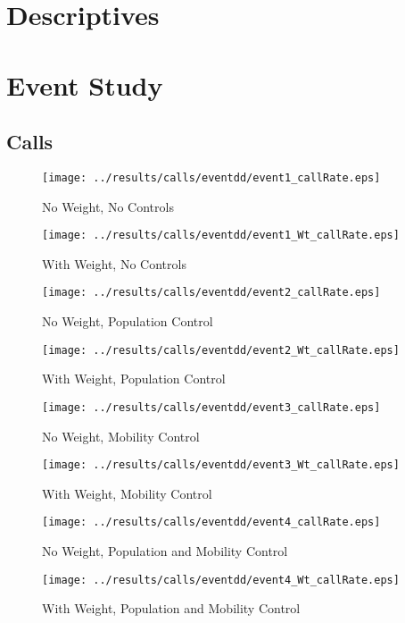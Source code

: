 \documentclass[11pt,letterpaper]{article}
\begin{document}
\section{Descriptives}

\section{Event Study}
	\subsection{Calls}
\begin{figure}[H]
\caption{No Weight, No Controls}
\centering
\texttt{[image: ../results/calls/eventdd/event1\_callRate.eps]}
\end{figure}

\begin{figure}[H]
\caption{With Weight, No Controls}
\centering
\texttt{[image: ../results/calls/eventdd/event1\_Wt\_callRate.eps]}
\end{figure}
\begin{figure}[H]
\caption{No Weight, Population Control}
\centering
\texttt{[image: ../results/calls/eventdd/event2\_callRate.eps]}
\end{figure}

\begin{figure}[H]
\caption{With Weight, Population Control}
\centering
\texttt{[image: ../results/calls/eventdd/event2\_Wt\_callRate.eps]}
\end{figure}
\begin{figure}[H]
\caption{No Weight, Mobility Control}
\centering
\texttt{[image: ../results/calls/eventdd/event3\_callRate.eps]}
\end{figure}

\begin{figure}[H]
\caption{With Weight, Mobility Control}
\centering
\texttt{[image: ../results/calls/eventdd/event3\_Wt\_callRate.eps]}
\end{figure}
\begin{figure}[H]
\caption{No Weight, Population and Mobility Control}
\centering
\texttt{[image: ../results/calls/eventdd/event4\_callRate.eps]}
\end{figure}

\begin{figure}[H]
\caption{With Weight, Population and Mobility Control}
\centering
\texttt{[image: ../results/calls/eventdd/event4\_Wt\_callRate.eps]}
\end{figure}
\end{document}
